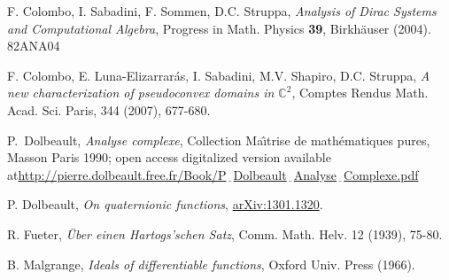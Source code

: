 \documentclass[12pt]{amsart}
\theoremstyle{definition}
\begin{document}
\begin{thebibliography}{HD}

\normalsize
\baselineskip=17pt

F. Colombo, I. Sabadini, F. Sommen, D.C. Struppa, \emph{Analysis of Dirac Systems and Computational Algebra}, Progress in Math. Physics {\bf 39}, Birkh\"auser (2004). 82ANA04

 F. Colombo, E. Luna-Elizarrar\'as, I. Sabadini, M.V. Shapiro, D.C. Struppa, \emph{A new characterization of pseudoconvex domains in ${\mathbb{C}}^2$}, Comptes Rendus Math. Acad. Sci. Paris, 344 (2007), 677-680. 

 P.~Dolbeault, \emph{Analyse complexe}, Collection Ma\^{\i}trise de math\'e\-matiques pures, Masson Paris 1990; 
open access digitalized version available at\newline \textsf{\small\href{http://pierre.dolbeault.free.fr/Book/P_Dolbeault_Analyse_Complexe.pdf}{http://pierre.dolbeault.free.fr/Book/P$\underline{\phantom x}$Dolbeault$\underline{\phantom x}$Analyse$\underline{\phantom x}$Complexe.pdf}}

 P. Dolbeault, \emph{On quaternionic functions}, \textsf{\small\href{http://arxiv.org/abs/1301.1320}{arXiv:1301.1320}}.

 R. Fueter, \emph{\"Uber einen Hartogs'schen Satz}, Comm. Math. Helv. 12 (1939), 75-80.

 B. Malgrange, \emph{Ideals of differentiable functions}, Oxford Univ. Press (1966).

\end{thebibliography}
\end{document}
